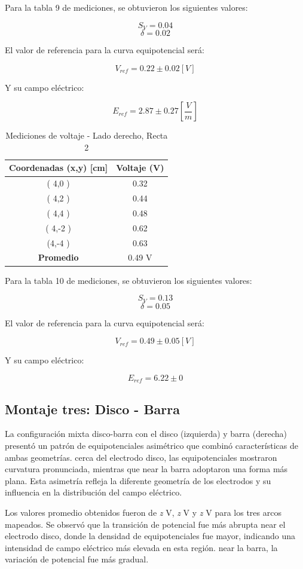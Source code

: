 \documentclass[11pt,twocolumn]{article}
\begin{document}
Para la tabla 9 de mediciones, se obtuvieron los siguientes valores:

\[S_V = 0.04\]
\[\delta = 0.02\]

El valor de referencia para la curva equipotencial será:

\[V_{ref} = 0.22 \pm 0.02 [V]\]

Y su campo eléctrico:

\[E_{ref} = 2.87 \pm 0.27 [\frac{V}{m}]\]

\begin{table}[h]
\centering
\caption{Mediciones de voltaje - Lado derecho, Recta 2}
\begin{tabular}{cc}
\toprule
\textbf{Coordenadas (x,y) [cm]} & \textbf{Voltaje (V)} \\
\midrule
( 4,0 ) & 0.32 \\
( 4,2 ) & 0.44 \\
( 4,4 ) & 0.48 \\
( 4,-2 ) & 0.62 \\
(4,-4 ) & 0.63 \\
\midrule
\textbf{Promedio} &  0.49 V\\
\bottomrule
\end{tabular}
\end{table}

Para la tabla 10 de mediciones, se obtuvieron los siguientes valores:

\[S_V = 0.13\]
\[\delta = 0.05\]

El valor de referencia para la curva equipotencial será:

\[V_{ref} = 0.49 \pm 0.05 [V]\]

Y su campo eléctrico:

\[E_{ref} = 6.22 \pm 0\]



\subsection*{Montaje tres: Disco - Barra}

La configuración mixta disco-barra con el disco (izquierda) y barra (derecha) presentó un patrón de equipotenciales asimétrico que combinó características de ambas geometrías. cerca del electrodo disco, las equipotenciales mostraron curvatura pronunciada, mientras que near la barra adoptaron una forma más plana. Esta asimetría refleja la diferente geometría de los electrodos y su influencia en la distribución del campo eléctrico.

Los valores promedio obtenidos fueron de \textit{z} V, \textit{z} V y \textit{z} V para los tres arcos mapeados. Se observó que la transición de potencial fue más abrupta near el electrodo disco, donde la densidad de equipotenciales fue mayor, indicando una intensidad de campo eléctrico más elevada en esta región. near la barra, la variación de potencial fue más gradual.
\end{document}
